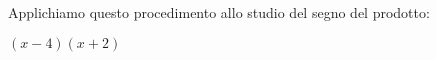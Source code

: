  \begin{esempio}
Applichiamo questo procedimento allo studio del segno del 
prodotto: 

$(x-4)(x+2)$

%   
%   
%   

\begin{comment}
 
 \begin{minipage}{.45\textwidth}
  
 \end{minipage}
 \begin{minipage}{.25\textwidth}
  
 \end{minipage}
 \begin{minipage}{.3\textwidth}
  
 \end{minipage}
 
\end{comment}


\end{esempio}
